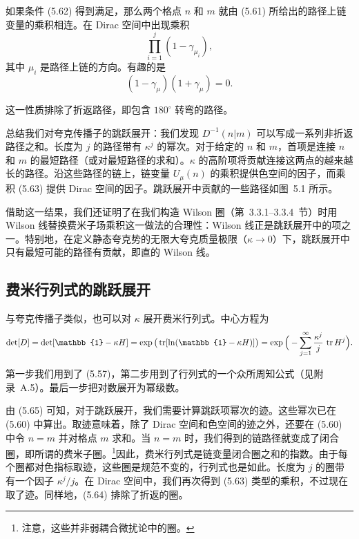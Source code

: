 如果条件 (5.62) 得到满足，那么两个格点 $n$ 和 $m$ 就由 (5.61) 所给出的路径上链变量的乘积相连。在 Dirac 空间中出现乘积
\begin{equation}
  \prod_{i=1}^{j}(1-\gamma_{\mu_i}) ,
\end{equation}
其中 $\mu_i$ 是路径上链的方向。有趣的是
\begin{equation}
  (1-\gamma_\mu)(1+\gamma_\mu) = 0 .
\end{equation}

这一性质排除了折返路径，即包含 $180^\circ$ 转弯的路径。

总结我们对夸克传播子的跳跃展开：我们发现 $D^{-1}(n|m)$ 可以写成一系列非折返路径之和。长度为 $j$ 的路径带有 $\kappa^j$ 的幂次。对于给定的 $n$ 和 $m$，首项是连接 $n$ 和 $m$ 的最短路径（或对最短路径的求和）。$\kappa$ 的高阶项将贡献连接这两点的越来越长的路径。沿这些路径的链上，链变量 $U_\mu(n)$ 的乘积提供色空间的因子，而乘积 (5.63) 提供 Dirac 空间的因子。跳跃展开中贡献的一些路径如图~5.1 所示。

借助这一结果，我们还证明了在我们构造 Wilson 圈（第~3.3.1--3.3.4~节）时用 Wilson 线替换费米子场乘积这一做法的合理性：Wilson 线正是跳跃展开中的项之一。特别地，在定义静态夸克势的无限大夸克质量极限（$\kappa \to 0$）下，跳跃展开中只有最短可能的路径有贡献，即直的 Wilson 线。

\subsection{费米行列式的跳跃展开}

与夸克传播子类似，也可以对 $\kappa$ 展开费米行列式。中心方程为
\begin{equation}
  \det[D] = \det[\mathbb{1}-\kappa H] = \exp\big(\tr[\ln(\mathbb{1}-\kappa H)]\big)
    = \exp\Big(-\sum_{j=1}^{\infty}\frac{\kappa^j}{j}\,\tr H^j\Big) .
\end{equation}

第一步我们用到了 (5.57)，第二步用到了行列式的一个众所周知公式（见附录~A.5）。最后一步把对数展开为幂级数。

由 (5.65) 可知，对于跳跃展开，我们需要计算跳跃项幂次的迹。这些幂次已在 (5.60) 中算出。取迹意味着，除了 Dirac 空间和色空间的迹之外，还要在 (5.60) 中令 $n = m$ 并对格点 $m$ 求和。当 $n = m$ 时，我们得到的链路径就变成了闭合圈，即所谓的费米子圈。\footnote{注意，这些并非弱耦合微扰论中的圈。}因此，费米行列式是链变量闭合圈之和的指数。由于每个圈都对色指标取迹，这些圈是规范不变的，行列式也是如此。长度为 $j$ 的圈带有一个因子 $\kappa^j/j$。在 Dirac 空间中，我们再次得到 (5.63) 类型的乘积，不过现在取了迹。同样地，(5.64) 排除了折返的圈。

